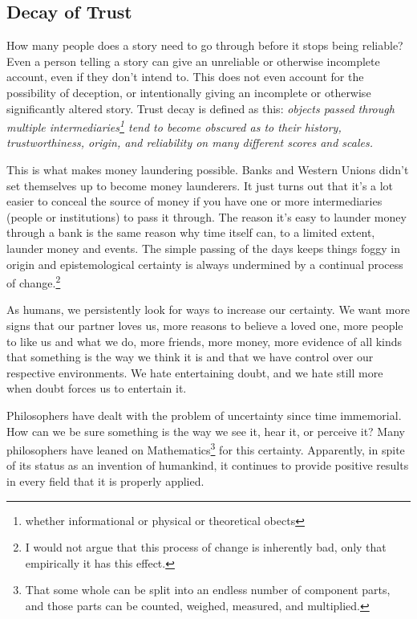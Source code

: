 \documentclass[a4paper,oneside]{article}
\begin{document}
\begin{multicols}{2}
\subsection{Decay of Trust}

How many people does a story need to go through before it stops being reliable? Even a person telling a story can give an unreliable or otherwise incomplete account, even if they don't intend to. This does not even account for the possibility of deception, or intentionally giving an incomplete or otherwise significantly altered story. Trust decay is defined as this: \textit{objects passed through multiple intermediaries\footnote{whether informational or physical or theoretical obects} tend to become obscured as to their history, trustworthiness, origin, and reliability on many different scores and scales.}

This is what makes money laundering possible. Banks and Western Unions didn't set themselves up to become money launderers. It just turns out that it's a lot easier to conceal the source of money if you have one or more intermediaries (people or institutions) to pass it through. The reason it's easy to launder money through a bank is the same reason why time itself can, to a limited extent, launder money and events.  The simple passing of the days keeps things foggy in origin and epistemological certainty is always undermined by a continual process of change.\footnote{I would not argue that this process of change is inherently bad, only that empirically it has this effect.} 

As humans, we persistently look for ways to increase our certainty. We want more signs that our partner loves us, more reasons to believe a loved one, more people to like us and what we do, more friends, more money, more evidence of all kinds that something is the way we think it is and that we have control over our respective environments. We hate entertaining doubt, and we hate still more when doubt forces us to entertain it.

Philosophers have dealt with the problem of uncertainty since time immemorial. How can we be sure something is the way we see it, hear it, or perceive it? Many philosophers have leaned on Mathematics\footnote{That some whole can be split into an endless number of component parts, and those parts can be counted, weighed, measured, and multiplied.} for this certainty. Apparently, in spite of its status as an invention of humankind, it continues to provide positive results in every field that it is properly applied.


\end{multicols}
\end{document}
